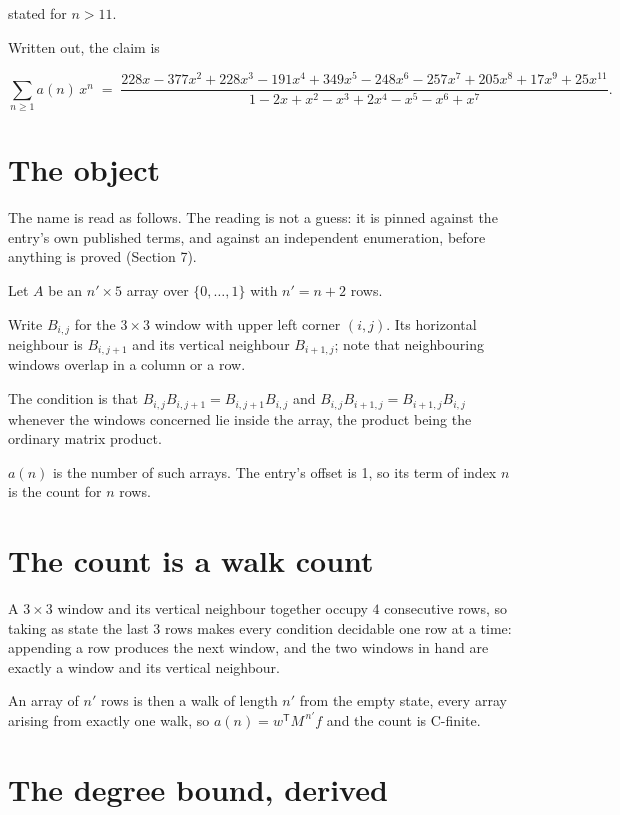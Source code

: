 \documentclass[11pt]{article}
\theoremstyle{definition}
\begin{document}
stated for $n > 11$.

Written out, the claim is

\[\sum_{n \ge 1} a(n)\,x^n \;=\; \frac{228x - 377x^{2} + 228x^{3} - 191x^{4} + 349x^{5} - 248x^{6} - 257x^{7} + 205x^{8} + 17x^{9} + 25x^{11}}{1 - 2x + x^{2} - x^{3} + 2x^{4} - x^{5} - x^{6} + x^{7}}.\]

\section{The object}

The name is read as follows. The reading is not a guess: it is pinned against the entry's own published terms, and against an independent enumeration, before anything is proved (Section 7).

Let $A$ be an $n' \times 5$ array over $\{0,\dots,1\}$ with $n' = n + 2$ rows.

Write $B_{i,j}$ for the $3\times3$ window with upper left corner $(i,j)$. Its horizontal neighbour is $B_{i,j+1}$ and its vertical neighbour $B_{i+1,j}$; note that neighbouring windows overlap in a column or a row.

The condition is that $B_{i,j}B_{i,j+1} = B_{i,j+1}B_{i,j}$ and $B_{i,j}B_{i+1,j} = B_{i+1,j}B_{i,j}$ whenever the windows concerned lie inside the array, the product being the ordinary matrix product.

$a(n)$ is the number of such arrays. The entry's offset is 1, so its term of index $n$ is the count for $n$ rows.

\section{The count is a walk count}

A $3\times3$ window and its vertical neighbour together occupy $4$ consecutive rows, so taking as state the last $3$ rows makes every condition decidable one row at a time: appending a row produces the next window, and the two windows in hand are exactly a window and its vertical neighbour.

An array of $n'$ rows is then a walk of length $n'$ from the empty state, every array arising from exactly one walk, so $a(n) = w^{\mathsf T}M^{\,n'}f$ and the count is C-finite.

\section{The degree bound, derived}
\end{document}
